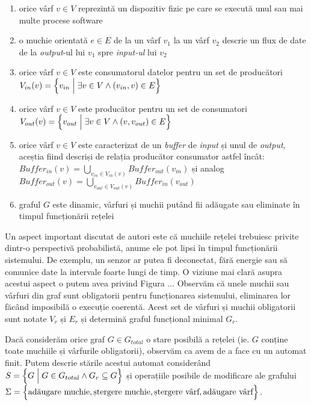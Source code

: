 \begin{enumerate}
    \item orice vârf $v \in V$ reprezintă un dispozitiv fizic pe care se execută unul sau mai multe procese software
    \item o muchie orientată $e \in E$ de la un vârf $v_1$ la un vârf $v_2$ descrie un flux de date de la \textit{output}-ul lui $v_1$ spre \textit{input-ul} lui $v_2$
    \item orice vârf $v \in V$ este consumatorul datelor pentru un set de producători $V_{in}(v) = \Big{\{} v_{in} \; \Big{|} \; \exists v \in V \land (v_{in}, v) \in E \Big{\}}$
    \item orice vârf $v \in V$ este producător pentru un set de consumatori $V_{out}(v) = \Big{\{} v_{out} \; \Big{|} \; \exists v \in V \land (v, v_{out}) \in E \Big{\}}$
    \item orice vârf $v \in V$ este caracterizat de un \textit{buffer} de \textit{input} și unul de \textit{output}, aceștia fiind descriși de relația producător consumator astfel încât: $Buffer_{in}(v) = \bigcup_{v_{in} \in V_{in}(v)} Buffer_{out}(v_{in})$ și analog $Buffer_{out}(v) = \bigcup_{v_{out} \in V_{out}(v)} Buffer_{in}(v_{out})$
    \item graful $G$ este dinamic, vârfuri și muchii putând fii adăugate sau eliminate în timpul funcționării rețelei
\end{enumerate}


Un aspect important discutat de autori este că muchiile rețelei trebuiesc privite dintr-o perspectivă probabilistă, anume ele pot lipsi în timpul funcționării sistemului. De exemplu, un senzor ar putea fi deconectat, fără energie sau să comunice date la intervale foarte lungi de timp. O viziune mai clară asupra acestui aspect o putem avea privind Figura ... Observăm că unele muchii sau vârfuri din graf sunt obligatorii pentru funcționarea sistemului, eliminarea lor făcând imposibilă o execuție coerentă. Acest set de vârfuri și muchii obligatorii sunt notate $V_r$ și $E_r$ și determină graful funcțional minimal $G_r$. %

Dacă considerăm orice graf $G \in G_{total}$ o stare posibilă a rețelei (ie. $G$ conține toate muchiile și vârfurile obligatorii), observăm ca avem de a face cu un automat finit. Putem descrie stările acestui automat considerând $S = \Big{\{} G  \; \Big{|} \; G \in G_{total} \land G_{r} \subseteq G \Big{\}}$ și operațiile posibile de modificare ale grafului $\Sigma = \Big{\{} \text{adăugare muchie}, \text{ștergere muchie}, \text{ștergere vârf}, \text{adăugare vârf} \Big{\}}$.

